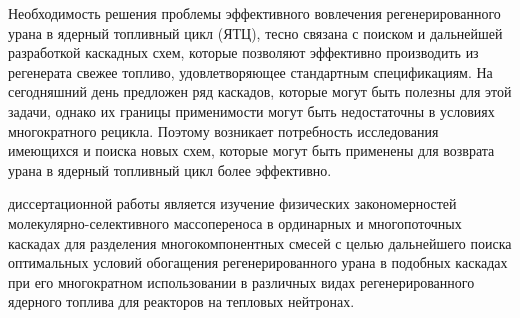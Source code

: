 Необходимость решения проблемы эффективного вовлечения регенерированного урана в ядерный топливный цикл (ЯТЦ), тесно связана с поиском и дальнейшей разработкой каскадных схем, которые позволяют эффективно производить из регенерата свежее топливо, удовлетворяющее стандартным спецификациям.
На сегодняшний день предложен ряд каскадов, которые могут быть полезны для этой задачи, однако их границы применимости могут быть недостаточны в условиях многократного рецикла. Поэтому возникает потребность исследования имеющихся и поиска новых схем, которые могут быть применены для возврата урана в ядерный топливный цикл более эффективно. 


{\aim} диссертационной работы является изучение физических закономерностей
молекулярно-селективного массопереноса в ординарных и многопоточных каскадах
для разделения многокомпонентных смесей с целью дальнейшего поиска
оптимальных условий обогащения регенерированного урана в подобных каскадах при
его многократном использовании в различных видах регенерированного ядерного
топлива для реакторов на тепловых нейтронах.

